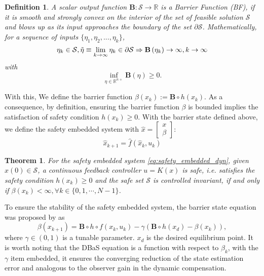\documentclass[english]{cccconf}
\newtheorem{theorem}{Theorem}
\newtheorem{definition}{Definition}
\begin{document}
\begin{definition}\label{def:barrier-state}
    A scalar output function $\boldsymbol{B}:\mathcal{S}\to\mathbb{R}$ is a Barrier Function (BF), if it is smooth and strongly convex on the interior of the set of feasible solution $\mathcal{S}$ and blows up as its input approaches the boundary of the set $\partial\mathcal{S}$. Mathematically, for a sequence of inputs $\{\eta_1,\eta_2,...,\eta_k\}$,
    \begin{equation*}
        \eta_k \in \mathcal{S}, \tilde{\eta} \equiv \lim _{k \rightarrow \infty} \eta_k \in \partial \mathcal{S} \Rightarrow \mathbf{B}\left(\eta_k\right) \rightarrow \infty, k \rightarrow \infty\\
    \end{equation*}
    with
    \begin{equation*}
        \inf _{\eta \in \mathbb{R}^{n+}} \mathbf{B}(\eta) \geq 0.
    \end{equation*}
\end{definition}

With this, We define the barrier function $\beta(x_k):=\boldsymbol{B}\circ h(x_k)$. As a consequence, by definition, ensuring the barrier function $\beta$ is bounded implies the satisfaction of safety condition $h(x_k) \geq 0$. With the barrier state defined above, we define the safety embedded system with $\hat{x} = \begin{bmatrix} x \\ \beta \end{bmatrix}$:
\begin{equation}\label{eq:safety_embedded_dyn}
    \hat{x}_{k+1} = \hat{f}(\hat{x}_k, u_k)
\end{equation}


\begin{theorem}\label{thm1}
    For the safety embedded system \eqref{eq:safety_embedded_dyn}, given $x(0)\in\mathcal{S}$, a continuous feedback controller $u=K(x)$ is safe, i.e. satisfies the safety condition $h(x_k) \geq 0$ and the safe set $\mathcal{S}$ is controlled invariant, if and only if $\beta(x_k)<\infty,\forall k\in \{0,1,\cdots,N-1\} $.
\end{theorem}

To ensure the stability of the safety embedded system, the barrier state equation was proposed by \cite{almubarak2023barrier} as 
\begin{equation}\label{eq:barrier-state}
\beta(x_{k+1})=\mathbf{B}\circ h \circ  f(x_k, u_k)-\gamma(\mathbf{B} \circ h(x_d)-\beta(x_k)),
\end{equation}
where $\gamma \in (0,1)$  is a tunable parameter. $x_d$ is the desired equilibrium point. It is worth noting that the DBaS equation is a function with respect to $\beta_k$, with the $\gamma$ item embedded, it ensures the converging reduction of the state estimation error and analogous to the observer gain in the dynamic compensation. 
 
\end{document}
